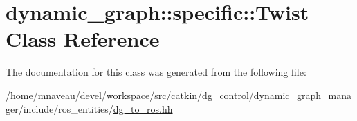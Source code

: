 \hypertarget{classdynamic__graph_1_1specific_1_1Twist}{}\section{dynamic\+\_\+graph\+:\+:specific\+:\+:Twist Class Reference}
\label{classdynamic__graph_1_1specific_1_1Twist}


The documentation for this class was generated from the following file\+:\begin{DoxyCompactItemize}
\item 
/home/mnaveau/devel/workspace/src/catkin/dg\+\_\+control/dynamic\+\_\+graph\+\_\+manager/include/ros\+\_\+entities/\hyperlink{dg__to__ros_8hh}{dg\+\_\+to\+\_\+ros.\+hh}\end{DoxyCompactItemize}
